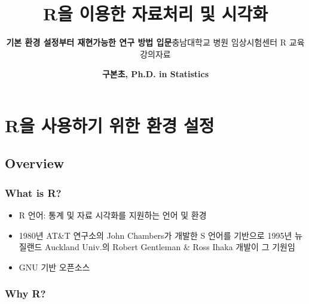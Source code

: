 \documentclass[11pt,a4paper]{book}
\title{\textbf{\LARGE R을 이용한 자료처리 및 시각화}}
\subtitle{\textbf{\Large 기본 환경 설정부터 재현가능한 연구 방법 입문}\vspace{2cm}\linebreak 충남대학교
병원 임상시험센터 R 교육 강의자료}
\author{\textbf{\Large 구본초, Ph.D. in Statistics}}
\date{}
\theoremstyle{definition}
\theoremstyle{definition}
\theoremstyle{definition}
\theoremstyle{remark}
\begin{document}
\maketitle

{
\hypersetup{linkcolor=black}
\setcounter{tocdepth}{1}
\tableofcontents
}
\chapter{R을 사용하기 위한 환경 설정}\label{r----}

\section{Overview}\label{overview}

\subsection{What is R?}\label{what-is-r}

\begin{itemize}
\item
  R 언어: 통계 및 자료 시각화를 지원하는 언어 및 환경
\item
  1980년 AT\&T 연구소의 John Chambers가 개발한 S 언어를 기반으로 1995년
  뉴질랜드 Auckland Univ.의 Robert Gentleman \& Ross Ihaka 개발이 그
  기원임
\item
  GNU 기반 오픈소스
\end{itemize}

\subsection{Why R?}\label{why-r}
\end{document}
